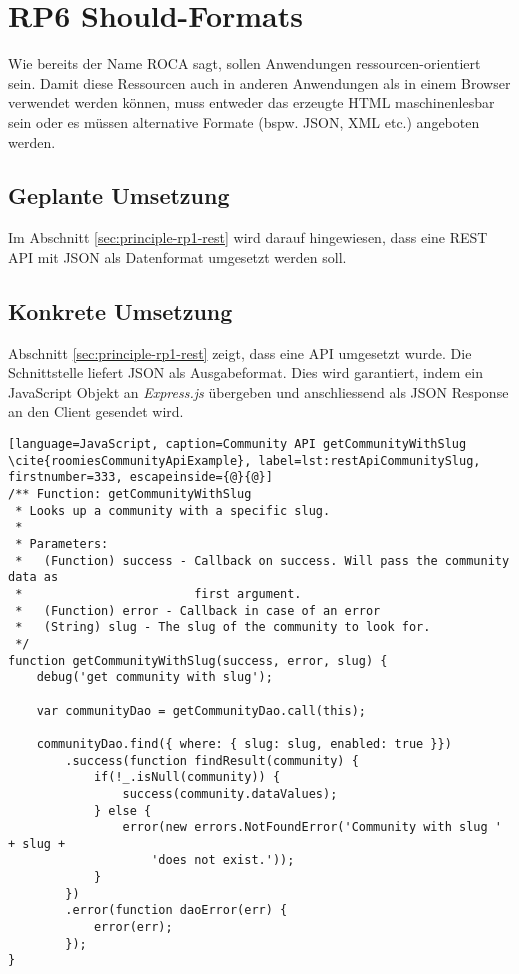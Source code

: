 \section{RP6 Should-Formats}
\label{sec:principle-rp6-should-formats}
Wie bereits der Name ROCA sagt, sollen Anwendungen ressourcen-orientiert sein. Damit diese Ressourcen auch in anderen Anwendungen als in einem Browser verwendet werden können, muss entweder das erzeugte HTML maschinenlesbar sein oder es müssen alternative Formate (bspw. JSON, XML etc.) angeboten werden.

\subsection*{Geplante Umsetzung}
Im Abschnitt \ref{sec:principle-rp1-rest}  wird darauf hingewiesen, dass eine REST API mit JSON als Datenformat umgesetzt werden soll.

\subsection*{Konkrete Umsetzung}
Abschnitt \ref{sec:principle-rp1-rest}  zeigt, dass eine API umgesetzt wurde.
Die Schnittstelle liefert JSON als Ausgabeformat. Dies wird garantiert, indem ein JavaScript Objekt an \emph{Express.js} übergeben und anschliessend als JSON Response \cite{ExpressjsResponseJsonConverter} an den Client gesendet \cite{ExpressjsResSend} wird.

\begin{lstlisting}[language=JavaScript, caption=Community API getCommunityWithSlug \cite{roomiesCommunityApiExample}, label=lst:restApiCommunitySlug, firstnumber=333, escapeinside={@}{@}]
/** Function: getCommunityWithSlug
 * Looks up a community with a specific slug.
 *
 * Parameters:
 *   (Function) success - Callback on success. Will pass the community data as
 *                        first argument.
 *   (Function) error - Callback in case of an error
 *   (String) slug - The slug of the community to look for.
 */
function getCommunityWithSlug(success, error, slug) {
	debug('get community with slug');

	var communityDao = getCommunityDao.call(this);

	communityDao.find({ where: { slug: slug, enabled: true }})
		.success(function findResult(community) {
			if(!_.isNull(community)) {
				success(community.dataValues);
			} else {
				error(new errors.NotFoundError('Community with slug ' + slug +
					'does not exist.'));
			}
		})
		.error(function daoError(err) {
			error(err);
		});
}
\end{lstlisting}

